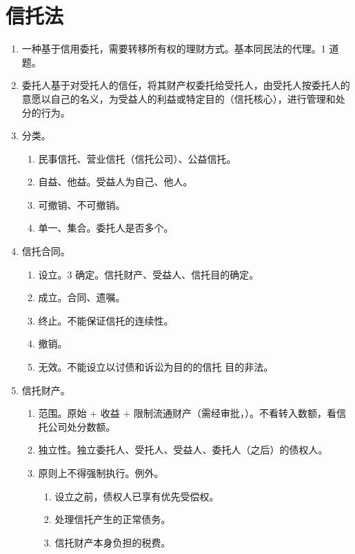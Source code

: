 \section{信托法}
\begin{enumerate}
  \item 一种基于信用委托，需要转移所有权的理财方式。基本同民法的代理。1 道题。
  \item 委托人基于对受托人的信任，将其财产权委托给受托人，由受托人按委托人的意愿以自己的名义，为受益人的利益或特定目的（信托核心），进行管理和处分的行为。
  \item 分类。
        \begin{enumerate}
          \item 民事信托、营业信托（信托公司）、公益信托。
          \item 自益、他益。受益人为自己、他人。
          \item 可撤销、不可撤销。
          \item 单一、集合。委托人是否多个。
        \end{enumerate}
  \item 信托合同。
        \begin{enumerate}
          \item 设立。3 确定。信托财产、受益人、信托目的确定。
          \item 成立。合同、遗嘱。
          \item 终止。不能保证信托的连续性。
          \item 撤销。
          \item 无效。不能设立以讨债和诉讼为目的的信托 \yjt 目的非法。
        \end{enumerate}
  \item 信托财产。
        \begin{enumerate}
          \item 范围。原始 + 收益 + 限制流通财产（需经审批，）。不看转入数额，看信托公司处分数额。
          \item 独立性。独立委托人、受托人、受益人、委托人（之后）的债权人。
          \item 原则上不得强制执行。例外。
                \begin{enumerate}
                  \item 设立之前，债权人已享有优先受偿权。
                  \item 处理信托产生的正常债务。
                  \item 信托财产本身负担的税费。
                \end{enumerate}

\end{enumerate}
\end{enumerate}
